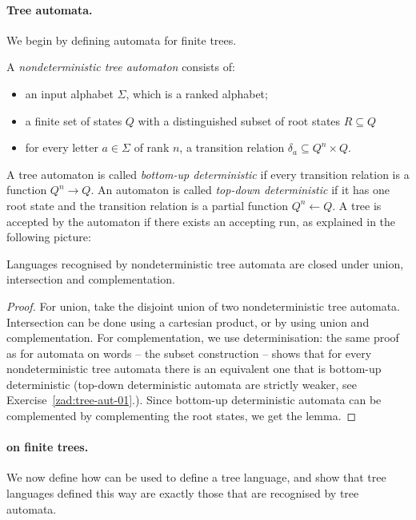 \paragraph*{Tree automata.} We begin by defining automata for finite trees.

\begin{definition}
A \emph{nondeterministic  tree automaton} consists of:
\begin{itemize}
	\item an input alphabet $\Sigma$, which is a ranked alphabet;
	\item a finite set of states $Q$ with a distinguished subset of root states $R \subseteq Q$
\item for every letter $a \in \Sigma$ of rank $n$, a transition relation $ \delta_a \subseteq Q^n \times Q$.
\end{itemize}
A tree automaton is called \emph{bottom-up deterministic} if every transition relation is  a function $Q^n \to Q$. An automaton is called \emph{top-down deterministic} if it has one root state and the  transition relation is  a partial function $Q^n \leftarrow Q$.	 A tree is accepted by the automaton if there exists an accepting run, as explained in the following picture:
\end{definition}


\begin{lemma}\label{lem:tree-aut-bool-alg}
  Languages recognised by nondeterministic tree automata are closed under union, intersection and complementation.
\end{lemma}
\begin{proof} For union,  take the disjoint union of two nondeterministic tree automata. Intersection can be done using a cartesian product, or by using union and complementation.  For complementation, we use determinisation: the same proof as for automata on words -- the subset construction -- shows that for every nondeterministic tree automata there is an equivalent one that is bottom-up deterministic (top-down deterministic automata are strictly weaker, see Exercise~\ref{zad:tree-aut-01}.). Since bottom-up deterministic automata can be complemented by complementing the root states, we get the lemma.
\end{proof}

\paragraph*{\mso on finite trees.} We now define how \mso can be used to define a tree language, and show that tree languages defined this way are exactly those that are recognised by tree automata.

